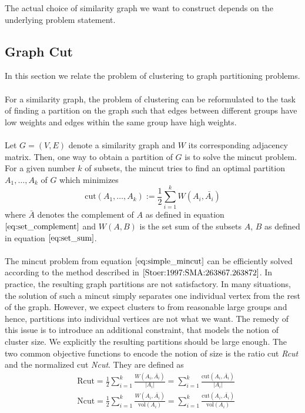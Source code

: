 The actual choice of similarity graph we want to construct depends on the underlying problem statement.

\subsection{Graph Cut}
\label{sec:graph_cut}
In this section we relate the problem of clustering to graph partitioning problems. \\ \\
For a similarity graph, the problem of clustering can be reformulated to the task of finding a partition on the graph such that edges between different groups have low weights and edges within the same group have high weights. \\ \\
Let $G = (V, E)$ denote a similarity graph and $W$ its corresponding adjacency matrix. Then, one way to obtain a partition of $G$ is to solve the mincut problem. For a given number $k$ of subsets, the mincut tries to find an optimal partition $A_1, \dots, A_k$ of $G$ which minimizes
\begin{equation}
\text{cut} \left( A_1, \dots, A_k \right) := \frac{1}{2} \sum_{i=1}^k W \left( A_i, \bar{A_i} \right)
\label{eq:simple_mincut} 
\end{equation}
where $\bar{A}$ denotes the complement of $A$ as defined in equation $\ref{eq:set_complement}$ and $W(A,B)$ is the set sum of the subsets $A$, $B$ as defined in equation $\ref{eq:set_sum}$. \\ \\
The mincut problem from equation $\ref{eq:simple_mincut}$ can be efficiently solved according to the method described in $\cite{Stoer:1997:SMA:263867.263872}$. In practice, the resulting graph partitions are not satisfactory. In many situations, the solution of such a mincut simply separates one individual vertex from the rest of the graph. However, we expect clusters to from reasonable large groups and hence, partitions into individual vertices are not what we want. The remedy of this issue is to introduce an additional constraint, that models the notion of cluster size. We explicitly the resulting partitions should be large enough. 
The two common objective functions to encode the notion of size is the ratio cut \textit{Rcut} and the normalized cut \textit{Ncut}. They are defined as
\begin{equation}
\begin{aligned}
&\text{Rcut} = \frac{1}{2} \sum_{i=1}^k \frac{W(A_i, \bar{A_i})}{\left| A_i\right|} = \sum_{i=1}^k \frac{\text{cut}(A_i, \bar{A_i})}{\left| A_i\right|} \\
&\text{Ncut} = \frac{1}{2} \sum_{i=1}^k \frac{W(A_i, \bar{A_i})}{\text{vol}(A_i)} = \sum_{i=1}^k \frac{\text{cut}(A_i, \bar{A_i})}{\text{vol}(A_i)}
\end{aligned}
\end{equation}
